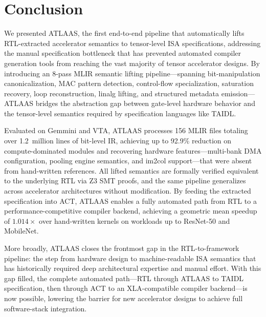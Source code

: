 \section{Conclusion}
\label{sec:conclusion}

We presented ATLAAS, the first end-to-end pipeline that automatically lifts RTL-extracted accelerator semantics to tensor-level ISA specifications, addressing the manual specification bottleneck that has prevented automated compiler generation tools from reaching the vast majority of tensor accelerator designs.
By introducing an 8-pass MLIR semantic lifting pipeline---spanning bit-manipulation canonicalization, MAC pattern detection, control-flow specialization, saturation recovery, loop reconstruction, linalg lifting, and structured metadata emission---ATLAAS bridges the abstraction gap between gate-level hardware behavior and the tensor-level semantics required by specification languages like TAIDL.

Evaluated on Gemmini and VTA, ATLAAS processes 156 MLIR files totaling over 1.2~million lines of bit-level IR, achieving up to 92.9\% reduction on compute-dominated modules and recovering hardware features---multi-bank DMA configuration, pooling engine semantics, and im2col support---that were absent from hand-written references.
All lifted semantics are formally verified equivalent to the underlying RTL via Z3 SMT proofs, and the same pipeline generalizes across accelerator architectures without modification.
By feeding the extracted specification into ACT, ATLAAS enables a fully automated path from RTL to a performance-competitive compiler backend, achieving a geometric mean speedup of $1.014\times$ over hand-written kernels on workloads up to ResNet-50 and MobileNet.

More broadly, ATLAAS closes the frontmost gap in the RTL-to-framework pipeline: the step from hardware design to machine-readable ISA semantics that has historically required deep architectural expertise and manual effort.
With this gap filled, the complete automated path---RTL through ATLAAS to TAIDL specification, then through ACT to an XLA-compatible compiler backend---is now possible, lowering the barrier for new accelerator designs to achieve full software-stack integration.
